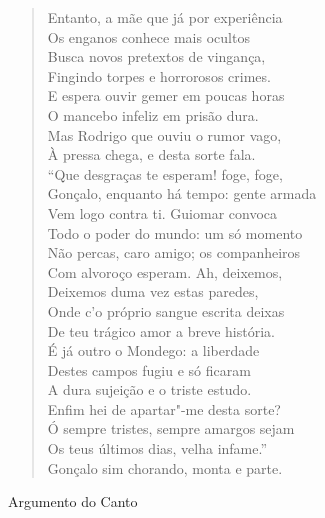 \begin{verse}
Entanto, a mãe que já por experiência\\
Os enganos conhece mais ocultos\\
Busca novos pretextos de vingança,\\
Fingindo torpes e horrorosos crimes.\\
E espera ouvir gemer em poucas horas\\
O mancebo infeliz em prisão dura.\\
Mas Rodrigo que ouviu o rumor vago,\\
À pressa chega, e desta sorte fala. \\[10pt]


``Que desgraças te esperam! foge, foge,\\
Gonçalo, enquanto há tempo: gente armada\\
Vem logo contra ti. Guiomar convoca\\
Todo o poder do mundo: um só momento\\
Não percas, caro amigo; os companheiros\\
Com alvoroço esperam. Ah, deixemos,\\
Deixemos duma vez estas paredes,\\
Onde c'o próprio sangue escrita deixas\\
De teu trágico amor a breve história.\\		
É já outro o Mondego: a liberdade\\			\index{\Monde}
Destes campos fugiu e só ficaram\\
A dura sujeição e o triste estudo.\\
Enfim hei de apartar"-me desta sorte?\\ 
Ó sempre tristes, sempre amargos sejam\\
Os teus últimos dias, velha infame.''\\
Gonçalo sim chorando, monta e parte. \\[10pt]
\end{verse}
\pagebreak 

\thispagestyle{empty}
\movetoevenpage
\mbox{}\vfill
\thispagestyle{empty}
\noindent Argumento do Canto 
\medskip

